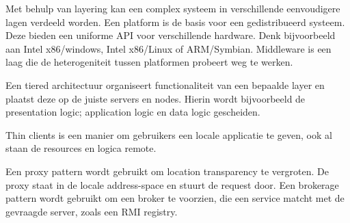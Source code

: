 \documentclass[../samenvatting.tex]{subfiles}
\begin{document}
Met behulp van layering kan een complex systeem in verschillende eenvoudigere lagen verdeeld worden. Een platform is de basis voor een gedistribueerd systeem.  Deze bieden een uniforme API voor verschillende hardware. Denk bijvoorbeeld aan Intel x86/windows, Intel x86/Linux of ARM/Symbian. Middleware is een laag die de heterogeniteit tussen platformen probeert weg te werken.

Een tiered architectuur organiseert functionaliteit van een bepaalde layer en plaatst deze op de juiste servers en nodes. Hierin wordt bijvoorbeeld de presentation logic; application logic en data logic gescheiden.

Thin clients is een manier om gebruikers een locale applicatie te geven, ook al staan de resources en logica remote.

Een proxy pattern wordt gebruikt om location transparency te vergroten. De proxy staat in de locale address-space en stuurt de request door. Een brokerage pattern wordt gebruikt om een broker te voorzien, die een service matcht met de gevraagde server, zoals een RMI registry. 
\end{document}
